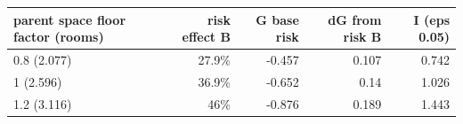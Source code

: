 \begin{tabular}{lrrrr}
\toprule
parent space floor factor (rooms) & risk effect B & G base risk & dG from risk B & I (eps 0.05) \\
\midrule
0.8 (2.077) & 27.9\% & -0.457 & 0.107 & 0.742 \\
1 (2.596) & 36.9\% & -0.652 & 0.14 & 1.026 \\
1.2 (3.116) & 46\% & -0.876 & 0.189 & 1.443 \\
\bottomrule
\end{tabular}
